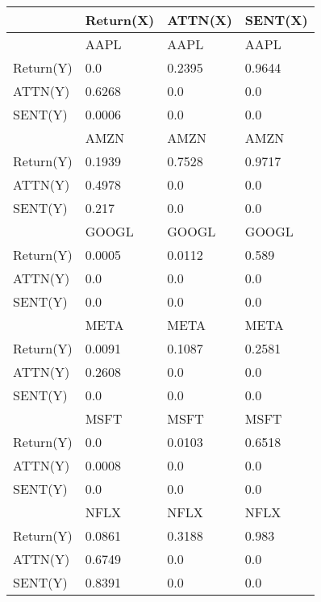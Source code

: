 \begin{tabular}{llll}
\toprule
{} & Return(X) & ATTN(X) & SENT(X) \\
\midrule
          &      AAPL &    AAPL &    AAPL \\
Return(Y) &       0.0 &  0.2395 &  0.9644 \\
ATTN(Y)   &    0.6268 &     0.0 &     0.0 \\
SENT(Y)   &    0.0006 &     0.0 &     0.0 \\
          &      AMZN &    AMZN &    AMZN \\
Return(Y) &    0.1939 &  0.7528 &  0.9717 \\
ATTN(Y)   &    0.4978 &     0.0 &     0.0 \\
SENT(Y)   &     0.217 &     0.0 &     0.0 \\
          &     GOOGL &   GOOGL &   GOOGL \\
Return(Y) &    0.0005 &  0.0112 &   0.589 \\
ATTN(Y)   &       0.0 &     0.0 &     0.0 \\
SENT(Y)   &       0.0 &     0.0 &     0.0 \\
          &      META &    META &    META \\
Return(Y) &    0.0091 &  0.1087 &  0.2581 \\
ATTN(Y)   &    0.2608 &     0.0 &     0.0 \\
SENT(Y)   &       0.0 &     0.0 &     0.0 \\
          &      MSFT &    MSFT &    MSFT \\
Return(Y) &       0.0 &  0.0103 &  0.6518 \\
ATTN(Y)   &    0.0008 &     0.0 &     0.0 \\
SENT(Y)   &       0.0 &     0.0 &     0.0 \\
          &      NFLX &    NFLX &    NFLX \\
Return(Y) &    0.0861 &  0.3188 &   0.983 \\
ATTN(Y)   &    0.6749 &     0.0 &     0.0 \\
SENT(Y)   &    0.8391 &     0.0 &     0.0 \\
\bottomrule
\end{tabular}
